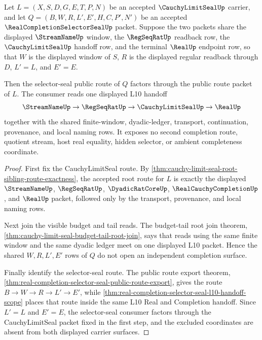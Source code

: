 \begin{theorem}
\label{thm:cauchy-limit-seal-selector-seal-compatibility}
Let $L=(X,S,D,G,E,T,P,N)$ be an accepted $\CauchyLimitSealUp$ carrier, and let $Q=(B,W,R,L',E',H,C,P',N')$ be an accepted $\RealCompletionSelectorSealUp$ packet. Suppose the two packets share the displayed $\StreamNameUp$ window, the $\RegSeqRatUp$ readback row, the $\CauchyLimitSealUp$ handoff row, and the terminal $\RealUp$ endpoint row, so that $W$ is the displayed window of $S$, $R$ is the displayed regular readback through $D$, $L'=L$, and $E'=E$.

Then the selector-seal public route of $Q$ factors through the public route packet of $L$. The consumer reads one displayed L10 handoff
$$
\StreamNameUp \to \RegSeqRatUp \to \CauchyLimitSealUp \to \RealUp
$$
together with the shared finite-window, dyadic-ledger, transport, continuation, provenance, and local naming rows. It exposes no second completion route, quotient stream, host real equality, hidden selector, or ambient completeness coordinate.
\end{theorem}
\begin{proof}
First fix the CauchyLimitSeal route. By \autoref{thm:cauchy-limit-seal-root-sibling-route-exactness}, the accepted root route for $L$ is exactly the displayed $\StreamNameUp$, $\RegSeqRatUp$, $\DyadicRatCoreUp$, $\RealCauchyCompletionUp$, and $\RealUp$ packet, followed only by the transport, provenance, and local naming rows.

Next join the visible budget and tail reads. The budget-tail root join theorem, \autoref{thm:cauchy-limit-seal-budget-tail-root-join}, says that reads using the same finite window and the same dyadic ledger meet on one displayed L10 packet. Hence the shared $W,R,L',E'$ rows of $Q$ do not open an independent completion surface.

Finally identify the selector-seal route. The public route export theorem, \autoref{thm:real-completion-selector-seal-public-route-export}, gives the route $B \to W \to R \to L' \to E'$, while \autoref{thm:real-completion-selector-seal-l10-handoff-scope} places that route inside the same L10 Real and Completion handoff. Since $L'=L$ and $E'=E$, the selector-seal consumer factors through the CauchyLimitSeal packet fixed in the first step, and the excluded coordinates are absent from both displayed carrier surfaces.
\end{proof}

